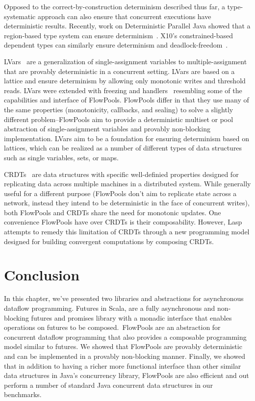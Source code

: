Opposed to the correct-by-construction determinism described thus far,
a type-systematic approach can also ensure that concurrent executions
have deterministic results.
Recently, work on Deterministic Parallel Java showed that a
region-based type system can ensure determinism~\cite{Bocchino09}.
X10's constrained-based dependent types can similarly ensure
determinism and deadlock-freedom~\cite{Saraswat07}.

LVars~\cite{LVars} are a generalization of single-assignment variables to
multiple-assignment that are provably deterministic in a concurrent setting.
LVars are based on a lattice and ensure determinism by allowing only monotonic
writes and threshold reads. LVars were extended with freezing and
handlers~\cite{LVarsFreezing} resembling some of the capabilities and interface
of FlowPools. FlowPools differ in that they use many of the same properties
(monotonicity, callbacks, and sealing) to solve a slightly different
problem--FlowPools aim to provide a deterministic multiset or pool abstraction
of single-assignment variables and provably non-blocking implementation. LVars
aim to be a foundation for ensuring determinism based on lattices, which can be
realized as a number of different types of data structures such as single
variables, sets, or maps.

CRDTs~\cite{CRDTs1, CRDTs2} are data structures with specific well-definied
properties designed for replicating data across multiple machines in a
distributed system. While generally useful for a different purpose (FlowPools
don't aim to replicate state across a network, instead they intend to be
deterministic in the face of concurrent writes), both FlowPools and CRDTs share
the need for monotonic updates. One convenience FlowPools have over CRDTs is
their composability. However, Lasp~\cite{Lasp} attempts to remedy this
limitation of CRDTs through a new programming model designed for building
convergent computations by composing CRDTs.

\section{Conclusion}

In this chapter, we've presented two libraries and abstractions for asynchronous
dataflow programming. Futures in Scala, are a fully asynchronous and
non-blocking futures and promises library with a monadic interface that enables
operations on futures to be composed. FlowPools are an abstraction for
concurrent dataflow programming that also provides a composable programming
model similar to futures. We showed that FlowPools are provably deterministic
and can be implemented in a provably non-blocking manner. Finally, we showed
that in addition to having a richer more functional interface than other similar
data structures in Java's concurrency library, FlowPools are also efficient and out perform a number of standard Java concurrent data structures in our benchmarks.

